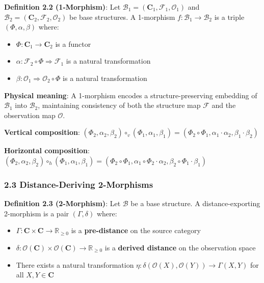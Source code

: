 \documentclass[
]{article}
\providecommand{\tightlist}{%
  \setlength{\itemsep}{0pt}\setlength{\parskip}{0pt}}
\begin{document}
\textbf{Definition 2.2 (1-Morphism)}: Let
\(\mathcal{B}_1 = (\mathbf{C}_1, \mathcal{F}_1, \mathcal{O}_1)\) and
\(\mathcal{B}_2 = (\mathbf{C}_2, \mathcal{F}_2, \mathcal{O}_2)\) be base
structures. A 1-morphism \(f: \mathcal{B}_1 \to \mathcal{B}_2\) is a
triple \((\Phi, \alpha, \beta)\) where:

\begin{itemize}
\tightlist
\item
  \(\Phi: \mathbf{C}_1 \to \mathbf{C}_2\) is a functor
\item
  \(\alpha: \mathcal{F}_2 \circ \Phi \Rightarrow \mathcal{F}_1\) is a
  natural transformation
\item
  \(\beta: \mathcal{O}_1 \Rightarrow \mathcal{O}_2 \circ \Phi\) is a
  natural transformation
\end{itemize}

\textbf{Physical meaning}: A 1-morphism encodes a structure-preserving
embedding of \(\mathcal{B}_1\) into \(\mathcal{B}_2\), maintaining
consistency of both the structure map \(\mathcal{F}\) and the
observation map \(\mathcal{O}\).

\textbf{Vertical composition}:
\((\Phi_2, \alpha_2, \beta_2) \circ_v (\Phi_1, \alpha_1, \beta_1) = (\Phi_2 \circ \Phi_1, \alpha_1 \cdot \alpha_2, \beta_1 \cdot \beta_2)\)

\textbf{Horizontal composition}:
\((\Phi_2, \alpha_2, \beta_2) \circ_h (\Phi_1, \alpha_1, \beta_1) = (\Phi_2 \circ \Phi_1, \alpha_1 \circ \Phi_2 \cdot \alpha_2, \beta_2 \circ \Phi_1 \cdot \beta_1)\)

\subsubsection{2.3 Distance-Deriving
2-Morphisms}\label{distance-deriving-2-morphisms}

\textbf{Definition 2.3 (2-Morphism)}: Let \(\mathcal{B}\) be a base
structure. A distance-exporting 2-morphism is a pair
\((\Gamma, \delta)\) where:

\begin{itemize}
\tightlist
\item
  \(\Gamma: \mathbf{C} \times \mathbf{C} \to \mathbb{R}_{\geq 0}\) is a
  \textbf{pre-distance} on the source category
\item
  \(\delta: \mathcal{O}(\mathbf{C}) \times \mathcal{O}(\mathbf{C}) \to \mathbb{R}_{\geq 0}\)
  is a \textbf{derived distance} on the observation space
\item
  There exists a natural transformation
  \(\eta: \delta(\mathcal{O}(X), \mathcal{O}(Y)) \to \Gamma(X, Y)\) for
  all \(X, Y \in \mathbf{C}\)
\end{itemize}
\end{document}
